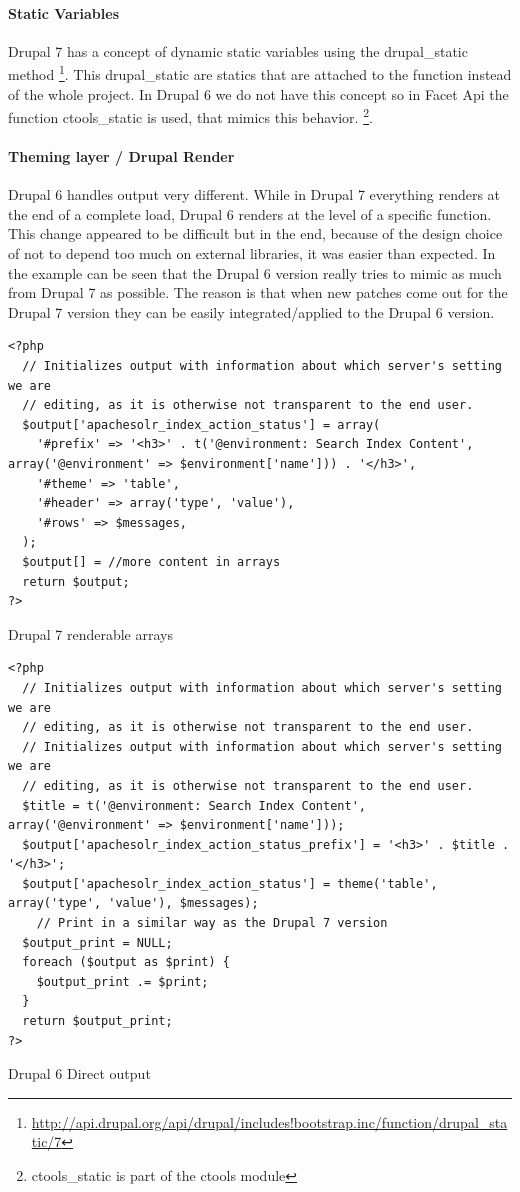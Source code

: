 \paragraph{Static Variables}
Drupal 7 has a concept of dynamic static variables using the drupal\_static method \footnote{\url{http://api.drupal.org/api/drupal/includes!bootstrap.inc/function/drupal_static/7}}. This drupal\_static are statics that are attached to the function instead of the whole project. In Drupal 6 we do not have this concept so in Facet Api the function ctools\_static is used, that mimics this behavior. \footnote{ctools\_static is part of the ctools module}.

\paragraph{Theming layer / Drupal Render}
Drupal 6 handles output very different. While in Drupal 7 everything renders at the end of a complete load, Drupal 6 renders at the level of a specific function. This change appeared to be difficult but in the end, because of the design choice of not to depend too much on external libraries, it was easier than expected. In the example can be seen that the Drupal 6 version really tries to mimic as much from Drupal 7 as possible. The reason is that when new patches come out for the Drupal 7 version they can be easily integrated/applied to the Drupal 6 version. 

\begin{verbatim}
<?php
  // Initializes output with information about which server's setting we are
  // editing, as it is otherwise not transparent to the end user.
  $output['apachesolr_index_action_status'] = array(
    '#prefix' => '<h3>' . t('@environment: Search Index Content', array('@environment' => $environment['name'])) . '</h3>',
    '#theme' => 'table',
    '#header' => array('type', 'value'),
    '#rows' => $messages,
  );
  $output[] = //more content in arrays
  return $output;
?>
\end{verbatim}
\caption{Drupal 7 renderable arrays}

\begin{verbatim}
<?php
  // Initializes output with information about which server's setting we are
  // editing, as it is otherwise not transparent to the end user.
  // Initializes output with information about which server's setting we are
  // editing, as it is otherwise not transparent to the end user.
  $title = t('@environment: Search Index Content', array('@environment' => $environment['name']));
  $output['apachesolr_index_action_status_prefix'] = '<h3>' . $title . '</h3>';
  $output['apachesolr_index_action_status'] = theme('table', array('type', 'value'), $messages);
    // Print in a similar way as the Drupal 7 version
  $output_print = NULL;
  foreach ($output as $print) {
    $output_print .= $print;
  }
  return $output_print;
?>
\end{verbatim}
\caption{Drupal 6 Direct output}

